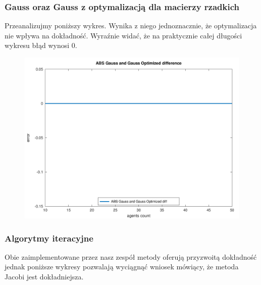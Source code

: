 \documentclass[10pt]{article}
\begin{document}
\subsubsection{Gauss oraz Gauss z optymalizacją dla macierzy rzadkich}
Przeanalizujmy poniższy wykres. Wynika z niego jednoznacznie, że optymalizacja nie wpływa na dokładność. Wyraźnie widać, że na praktycznie całej długości wykresu błąd wynosi 0.
\begin{figure}[h]
\centering
\includegraphics[scale=0.43]{plots/07_abs_gauss_and_gauss_optimized_all_rows.png}
\end{figure}

\subsubsection{Algorytmy iteracyjne}
Obie zaimplementowane przez nasz zespół metody oferują przyzwoitą dokładność jednak poniższe wykresy pozwalają wyciągnąć wniosek mówiący, że metoda Jacobi jest dokładniejsza.
\end{document}
